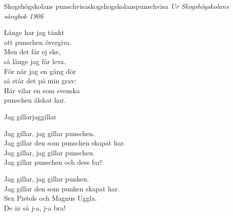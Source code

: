 \begin{song}{Skogshögskolans punschvisa}{skogshogskolanspunschvisa}
\textit{Ur Skogshögskolans sångbok 1906}
\begin{vers}
Länge har jag tänkt \\
att punschen övergiva.\\
Men det får ej ske,\\
så länge jag får leva.\\
För när jag en gång dör\\
så står det på min grav:\\
Här vilar en som svenska \\
punschen älskat har.\\
\end{vers}
\end{song}

\begin{song}{Jag gillar}{jaggillar}
\begin{vers}
Jag gillar, jag gillar punschen.\\
Jag gillar den som punschen skapat har.\\
Jag gillar, jag gillar punschen.\\
Jag gillar punschen och dess far!\\
\end{vers}
\begin{vers}
Jag gillar, jag gillar punken.\\
Jag gillar den som punken skapat har.\\
Sex Pistols och Magnus Uggla.\\
De är så j-a, j-a bra! 
\end{vers}
\end{song}

\newpage


